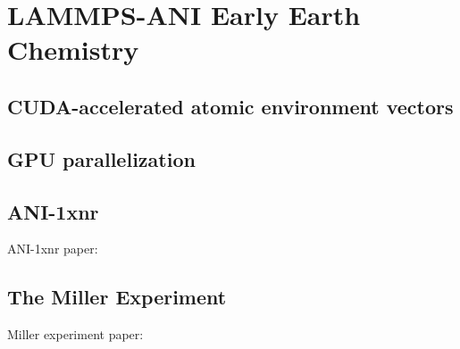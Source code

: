 \chapter{LAMMPS-ANI Early Earth Chemistry} 
\label{chapter4}

\section{CUDA-accelerated atomic environment vectors}
\label{sec:cuaevs}

\section{GPU parallelization}
\label{sec:lammps-ani-gpu-parallelization}

\section{ANI-1xnr}
\label{sec:ani-1xnr}

ANI-1xnr paper: \cite{ani-1xnr}

\section{The Miller Experiment}
\label{sec:miller_experiment}

Miller experiment paper: \cite{miller_experiment}\\
